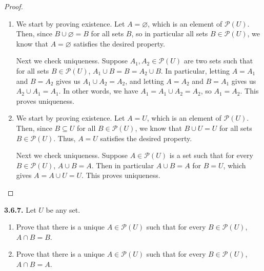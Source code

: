 \documentclass[12pt]{amsart}
\newenvironment{statement}[1]{\smallskip\noindent\color[rgb]{.6627, .3529, .6314} {\bf #1.}}{}
\theoremstyle{definition}
\theoremstyle{remark}
\newcommand{\powerset}[1]{\mathscr{P} \left( #1 \right)}
\begin{document}
\begin{proof}
\hfill
\begin{enumerate}
	\item We start by proving existence.
	Let $A = \varnothing$, which is an element of $\powerset{U}$.
	Then, since $B \cup \varnothing = B$ for all sets $B$, so in particular all sets $B \in \powerset{U}$,
	we know that $A = \varnothing$ satisfies the desired property.
	
	Next we check uniqueness.
	Suppose $A_1, A_2 \in \powerset{U}$ are two sets such that for all sets $B \in \powerset{U}$,
	$A_1 \cup B = B = A_2 \cup B$.
	In particular, letting $A = A_1$ and $B = A_2$ gives us $A_1 \cup A_2 = A_2$,
	and letting $A = A_2$ and $B = A_1$ gives us $A_2 \cup A_1 = A_1$.
	In other words, we have $A_1 = A_1 \cup A_2 = A_2$, so $A_1 = A_2$.
	This proves uniqueness.
	
	\item We start by proving existence.
	Let $A = U$, which is an element of $\powerset{U}$.
	Then, since $B \subseteq U$ for all $B \in \powerset{U}$, we know that $B \cup U = U$ for all
	sets $B \in \powerset{U}$.
	Thus, $A = U$ satisfies the desired property.
	
	Next we check uniqueness.
	Suppose $A \in \powerset{U}$ is a set such that for every $B \in \powerset{U}$, $A \cup B = A$.
	Then in particular $A \cup B = A$ for $B = U$, which gives $A = A \cup U = U$.
	This proves uniqueness.
\end{enumerate}
\end{proof}


\begin{statement}{3.6.7}
Let $U$ be any set.
\begin{enumerate}
	\item Prove that there is a unique $A \in \powerset{U}$ such that for every $B \in \powerset{U}$,
	$A \cap B = B$.
	
	\item Prove that there is a unique $A \in \powerset{U}$ such that for every $B \in \powerset{U}$,
	$A \cap B = A$.
\end{enumerate}
\end{statement}
\end{document}
